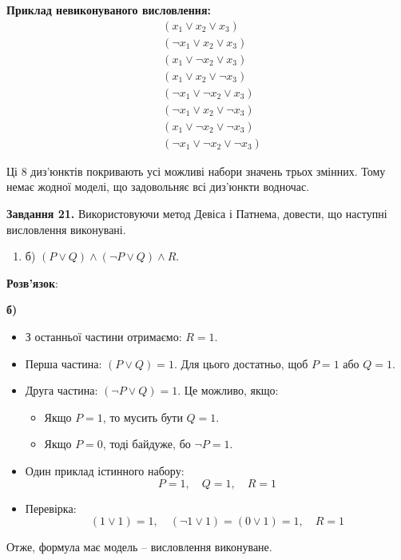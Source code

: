 \documentclass[a4paper,14pt]{extarticle} %
\begin{document}
\textbf{Приклад невиконуваного висловлення:}
\[
\begin{aligned}
& (x_1 \lor x_2 \lor x_3) \\
& (\neg x_1 \lor x_2 \lor x_3) \\
& (x_1 \lor \neg x_2 \lor x_3) \\
& (x_1 \lor x_2 \lor \neg x_3) \\
& (\neg x_1 \lor \neg x_2 \lor x_3) \\
& (\neg x_1 \lor x_2 \lor \neg x_3) \\
& (x_1 \lor \neg x_2 \lor \neg x_3) \\
& (\neg x_1 \lor \neg x_2 \lor \neg x_3)
\end{aligned}
\]

Ці 8 диз’юнктів покривають усі можливі набори значень трьох змінних. Тому немає жодної моделі, що задовольняє всі диз’юнкти водночас.

\vspace{1cm} %
\textbf{Завдання 21.} Використовуючи метод Девіса і Патнема, довести,
що наступні висловлення виконувані.

\begin{enumerate}[label=]
    \item б) $(P \lor Q) \land (\neg P \lor Q) \land R. $
\end{enumerate}

\textbf{Розв'язок}:

\textbf{б)}
\begin{itemize}
  \item З останньої частини отримаємо: \( R = 1 \).
  \item Перша частина: \((P \lor Q) = 1\). Для цього достатньо, щоб \( P = 1 \) або \( Q = 1 \).
  \item Друга частина: \((\neg P \lor Q) = 1\). Це можливо, якщо:
    \begin{itemize}
      \item Якщо \( P=1 \), то мусить бути \( Q=1 \).
      \item Якщо \( P=0 \), тоді байдуже, бо \(\neg P=1\).
    \end{itemize}
  \item Один приклад істинного набору:  
  \[
  P=1, \quad Q=1, \quad R=1
  \]
  \item Перевірка:  
  \[
  (1 \lor 1)=1, \quad (\neg 1 \lor 1)=(0 \lor 1)=1, \quad R=1
  \]
\end{itemize}

Отже, формула має модель – висловлення виконуване.
\end{document}
